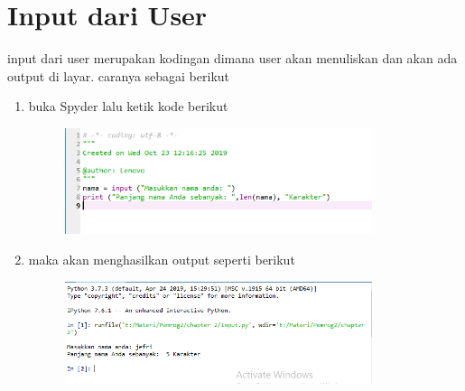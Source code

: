 \chapter*{ Input dari User}
\par
input dari user merupakan kodingan dimana user akan menuliskan dan akan ada output di layar. caranya sebagai berikut

\begin{enumerate}
	\item buka Spyder lalu ketik kode berikut
	\begin{figure} [h]
	\includegraphics[width=9cm]{input/inp1.png}
	\centering
	\end{figure}
	

	\item maka akan menghasilkan output seperti berikut
	\begin{figure} [h]
	\includegraphics[width=9cm]{input/inp2.png}
	\centering
	\end{figure}
	
	
\end{enumerate}
